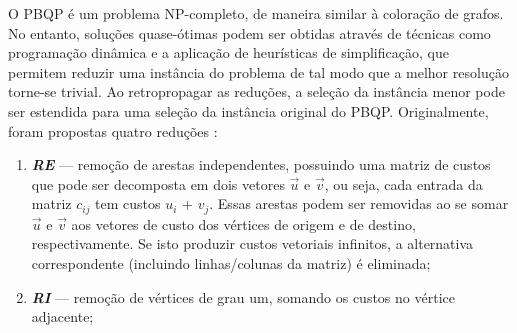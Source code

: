 \documentclass[
	12pt,				%
	openright,			%
	twoside,			%
	a4paper,			%
	tcc,			%
	]{ABNT-DC-UEL}
\begin{document}
O PBQP é um problema NP-completo, de maneira similar à coloração de grafos. No entanto, soluções quase-ótimas podem ser obtidas através de técnicas como programação dinâmica e a aplicação de heurísticas de simplificação, que permitem reduzir uma instância do problema de tal modo que a melhor resolução torne-se trivial. Ao retropropagar as reduções, a seleção da instância menor pode ser estendida para uma seleção da instância original do PBQP. Originalmente, foram propostas quatro reduções \cite{buchwald:10, eckstein:03}:
\begin{enumerate}
    \item \textit{\textbf{RE}} --- remoção de arestas independentes, possuindo uma matriz de custos que pode ser decomposta em dois vetores $\Vec{u}$ e $\Vec{v}$, ou seja, cada entrada da matriz $c_{ij}$ tem custos $u_i$ + $v_j$. Essas arestas podem ser removidas ao se somar $\Vec{u}$ e $\Vec{v}$ aos vetores de custo dos vértices de origem e de destino, respectivamente. Se isto produzir custos vetoriais infinitos, a alternativa correspondente (incluindo linhas/colunas da matriz) é eliminada;

    \begin{figure}[H]
        \centering
    \end{figure}

    \item \textit{\textbf{RI}} --- remoção de vértices de grau um, somando os custos no vértice adjacente;

    \begin{figure}[H]
        \centering
\end{figure}
\end{enumerate}
\end{document}
